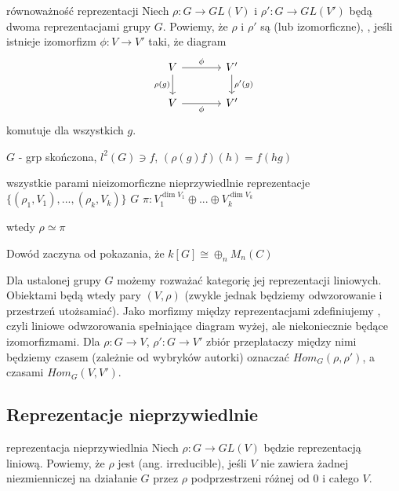 \begin{definition}{równoważność reprezentacji}{}
  Niech $\rho:G\to GL(V)$ i $\rho':G\to GL(V')$ będą dwoma reprezentacjami grupy $G$. Powiemy, że $\rho$ i $\rho'$ są  (lub izomorficzne), , jeśli istnieje izomorfizm $\phi: V\to V'$ taki, że diagram
  $$\begin{tikzcd}[column sep=large]
    V\arrow[r, "\phi"]\arrow[d, "\rho(g)" left] & V'\arrow[d, "\rho'(g)"]\\ 
    V\arrow[r, "\phi" below] & V'
  \end{tikzcd}$$
  komutuje dla wszystkich $g$.
\end{definition}

\begin{example}
  $G$ - grp skończona, $l^2(G)\ni f$, $(\rho(g)f)(h)=f(hg)$

  wszystkie parami nieizomorficzne nieprzywiedlnie reprezentacje $\{(\rho_1, V_1),...,(\rho_k, V_k)\}$ $G$
  $\pi: V_1^{\dim V_1}\oplus...\oplus V_k^{\dim V_k}$

  wtedy $\rho\simeq \pi$


  Dowód zaczyna od pokazania, że $k[G]\cong \oplus_{n} M_n(C)$

\end{example}

Dla ustalonej grupy $G$ możemy rozważać kategorię jej reprezentacji liniowych. Obiektami będą wtedy pary $(V, \rho)$ (zwykle jednak będziemy odwzorowanie i przestrzeń utożsamiać). Jako morfizmy między reprezentacjami zdefiniujemy , czyli liniowe odwzorowania spełniające diagram wyżej, ale niekoniecznie będące izomorfizmami. Dla $\rho:G\to V$, $\rho':G\to V'$ zbiór przeplataczy między nimi będziemy czasem (zależnie od wybryków autorki) oznaczać $Hom_G(\rho, \rho')$, a czasami $Hom_G(V,V')$.

\subsection{Reprezentacje nieprzywiedlnie}

\begin{definition}{reprezentacja nieprzywiedlnia}{}
  Niech $\rho:G\to GL(V)$ będzie reprezentacją liniową. Powiemy, że $\rho$ jest  (ang. irreducible), jeśli $V$ nie zawiera żadnej niezmienniczej na działanie $G$ przez $\rho$ podprzestrzeni różnej od $0$ i całego $V$.
\end{definition}

